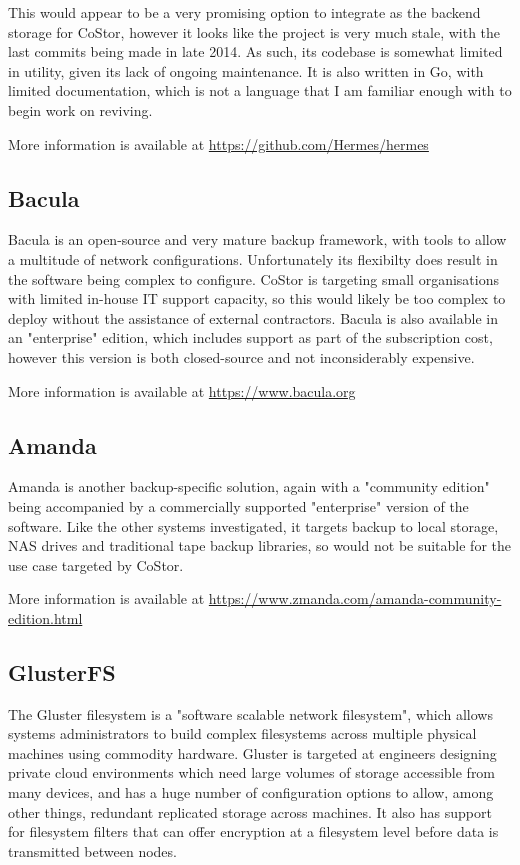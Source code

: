 \documentclass[bsc,frontabs,twoside,singlespacing,parskip,deptreport]{infthesis}     %
\begin{document}
This would appear to be a very promising option to integrate as the backend storage for CoStor,
however it looks like the project is very much stale, with the last commits being made in late 
2014. As such, its codebase is somewhat limited in utility, given its lack of ongoing 
maintenance. It is also written in Go, with limited documentation, which is not a language
that I am familiar enough with to begin work on reviving.

More information is available at \url{https://github.com/Hermes/hermes} \cite{hermes}

\subsection{Bacula}

Bacula is an open-source and very mature backup framework, with tools to allow a multitude of
network configurations. Unfortunately its flexibilty does result in the software being complex
to configure. CoStor is targeting small organisations with limited in-house IT support capacity,
so this would likely be too complex to deploy without the assistance of external contractors. 
Bacula is also available in an "enterprise" edition\cite{bacula-ent}, which includes 
support as part of the subscription cost, however this version is both closed-source and
not inconsiderably expensive.

More information is available at \url{https://www.bacula.org} \cite{bacula}

\subsection{Amanda}

Amanda is another backup-specific solution, again with a "community edition" being accompanied
by a commercially supported "enterprise" version of the software. Like the other systems 
investigated, it targets backup to local storage, NAS drives and traditional tape backup
libraries, so would not be suitable for the use case targeted by CoStor.

More information is available at \url{https://www.zmanda.com/amanda-community-edition.html} \cite{zmanda}

\subsection{GlusterFS}

The Gluster filesystem is a "software scalable network filesystem"\cite{gluster-home}, which 
allows systems administrators to build complex filesystems across multiple physical machines
using commodity hardware. Gluster is targeted at engineers designing private cloud environments
which need large volumes of storage accessible from many devices, and has a huge number of 
configuration options to allow, among other things, redundant replicated storage across machines.
It also has support for filesystem filters that can offer encryption at a filesystem level before
data is transmitted between nodes.
\end{document}
